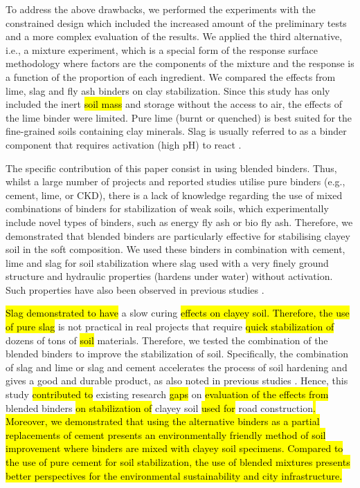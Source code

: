 \documentclass[constrmater,article,submit,pdftex,moreauthors]{Definitions/mdpi}
\begin{document}
To address the above drawbacks, we performed the experiments with the constrained design which included the increased amount of the preliminary tests and a more complex evaluation of the results. We applied the third alternative, i.e., a mixture experiment, which is a special form of the response surface methodology where factors are the components of the mixture and the response is a function of the proportion of each ingredient. We compared the effects from lime, slag and fly ash binders on clay stabilization. Since this study has only included the inert \hl{soil mass} and storage without the access to air, the effects of the lime binder were limited. Pure lime (burnt or quenched) is best suited for the fine-grained soils containing clay minerals. Slag is usually referred to as a binder component that requires activation (high pH) to react \citep{Sherwood,Lindh2022a}. 

The specific contribution of this paper consist in using blended binders. Thus, whilst a large number of projects and reported studies utilise pure binders (e.g., cement, lime, or CKD), there is a lack of knowledge regarding the use of mixed combinations of binders for stabilization of weak soils, which experimentally include novel types of binders, such as energy fly ash or bio fly ash. Therefore, we demonstrated that blended binders are particularly effective for stabilising clayey soil in the soft composition. We used these binders in combination with cement, lime and slag for soil stabilization where slag used with a very finely ground structure and hydraulic properties (hardens under water) without activation. Such properties have also been observed in previous studies \citep{Lindh2000,Lindh2001}. 

\hl{Slag demonstrated to have} a slow curing \hl{effects on clayey soil. Therefore, the use of pure slag} is not practical\hl{ }in real projects that require \hl{quick stabilization of} dozens of tons of \hl{soil }materials. Therefore, we tested the combination of the blended binders to improve the stabilization of soil. Specifically, the combination of slag and lime or slag and cement accelerates the process of soil hardening and gives a good and durable product, as also noted in previous studies \cite{Lindh2021a}. Hence, this study \hl{contributed to} existing research \hl{gaps} on \hl{evaluation of the effects from }blended binders \hl{on stabilization of }clayey soil \hl{used for }road construction\hl{. Moreover, we demonstrated that using the alternative binders as a partial replacements of cement presents an environmentally friendly method of soil improvement where binders are mixed with clayey soil specimens. Compared to the use of pure cement for soil stabilization, the use of blended mixtures presents better perspectives for the environmental sustainability and city infrastructure.}
\end{document}
